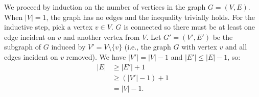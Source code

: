 \exercise
We proceed by induction on the number of vertices in the graph $G=(V,E)$.
When $|V|=1$, the graph has no edges and the inequality trivially holds.
For the inductive step, pick a vertex $v\in V$.
$G$ is connected so there must be at least one edge incident on $v$ and another vertex from $V$.
Let $G'=(V',E')$ be the subgraph of $G$ induced by $V'=V\setminus\{v\}$ (i.e., the graph $G$ with vertex $v$ and all edges incident on $v$ removed).
We have $|V'|=|V|-1$ and $|E'|\le |E|-1$, so:
\begin{align*}
    |E| &\ge |E'|+1 \\
    &\ge (|V'|-1)+1 \tag{by the inductive hypothesis applied for $G'$} \\
    &= |V|-1.
\end{align*}

